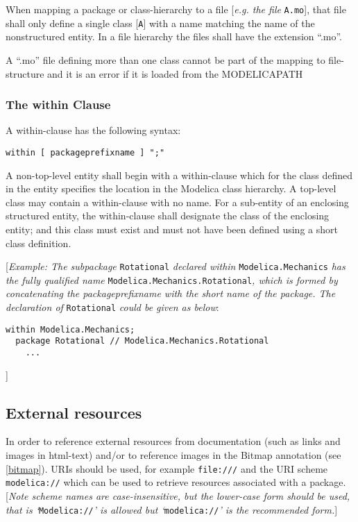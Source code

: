 When mapping a package or class-hierarchy to a file {[}\emph{e.g. the
  file} \lstinline!A.mo!{]}, that file shall only define a single class {[}\lstinline!A!{]} with a
name matching the name of the nonstructured entity. In a file hierarchy
the files shall have the extension ``.mo''.

A ``.mo'' file defining more than one class cannot be part of the mapping
to file-structure and it is an error if it is loaded from the
MODELICAPATH

\subsubsection{The within Clause}

A within-clause has the following syntax:

\begin{lstlisting}[language=grammar]
  within [ packageprefixname ] ";"
\end{lstlisting}
  A non-top-level entity shall begin with a within-clause which for the
  class defined in the entity specifies the location in the Modelica class
    hierarchy. A top-level class may contain a within-clause with no name.
    For a sub-entity of an enclosing structured entity, the within-clause
shall designate the class of the enclosing entity; and this class must
exist and must not have been defined using a short class definition.

{[}\emph{Example: The subpackage} \lstinline!Rotational! \emph{declared within}
\lstinline!Modelica.Mechanics! \emph{has the fully qualified name}
\lstinline!Modelica.Mechanics.Rotational!\emph{, which is formed by concatenating
the packageprefixname with the short name of the package. The
declaration of} \lstinline!Rotational! \emph{could be given as below}:

\begin{lstlisting}[language=modelica]
  within Modelica.Mechanics;
  package Rotational // Modelica.Mechanics.Rotational
    ...
\end{lstlisting}
{]}

\subsection{External resources}

In order to reference external resources from documentation (such as
links and images in html-text) and/or to reference images in the Bitmap
annotation (see \autoref{bitmap}). URIs should be used, for example
\lstinline!file:///! and the URI scheme \lstinline!modelica://! which can be used to retrieve
resources associated with a package. {[}\emph{Note scheme names are
case-insensitive, but the lower-case form should be used, that is
`}\lstinline!Modelica://!\emph{' is allowed but `}\lstinline!modelica://!\emph{' is the
recommended form.}{]}

